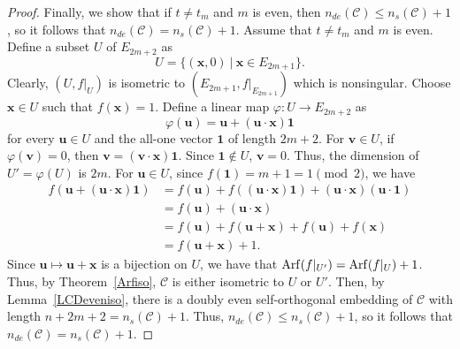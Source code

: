 \documentclass{article}
\theoremstyle{definition}
\theoremstyle{remark}
\begin{document}
\begin{proof}
    Finally, we show that if $t\ne t_m$ and $m$ is even, then $n_{de}(\mathcal{C})\le n_s(\mathcal{C})+1$, so it follows that $n_{de}(\mathcal{C})= n_s(\mathcal{C})+1$. Assume that $t\ne t_m$ and $m$ is even. Define a subset $U$ of $E_{2m+2}$ as
    \[
    U=\{(\mathbf{x}, 0)~|~\mathbf{x}\in E_{2m+1}\}.
    \]
    Clearly, $(U, f|_U)$ is isometric to $(E_{2m+1}, f|_{E_{2m+1}})$ which is nonsingular. Choose $\mathbf{x}\in U$ such that $f(\mathbf{x})=1$. Define a linear map $\varphi:U\to E_{2m+2}$ as
    \[
    \varphi(\mathbf{u})=\mathbf{u}+(\mathbf{u}\cdot \mathbf{x})\mathbf{1}
    \]
    for every $\mathbf{u}\in U$ and the all-one vector $\mathbf{1}$ of length $2m+2$. For $\mathbf{v}\in U$, if $\varphi(\mathbf{v})=0$, then $\mathbf{v}=(\mathbf{v}\cdot \mathbf{x})\mathbf{1}$. Since $\mathbf{1}\notin U$, $\mathbf{v}=0$. Thus, the dimension of $U'=\varphi(U)$ is $2m$.
    For $\mathbf{u}\in U$, since $f(\mathbf{1})=m+1=1\pmod 2$, we have
    \begin{align*}
    f(\mathbf{u}+(\mathbf{u}\cdot \mathbf{x})\mathbf{1})&=f(\mathbf{u})+f((\mathbf{u}\cdot \mathbf{x})\mathbf{1})+(\mathbf{u}\cdot \mathbf{x})(\mathbf{u}\cdot \mathbf{1})\\&=f(\mathbf{u})+(\mathbf{u}\cdot \mathbf{x})\\&=f(\mathbf{u})+f(\mathbf{u}+\mathbf{x})+f(\mathbf{u})+f(\mathbf{x})\\&=f(\mathbf{u}+\mathbf{x})+1.
    \end{align*}
    Since $\mathbf{u}\mapsto\mathbf{u}+\mathbf{x}$ is a bijection on $U$, we have that ${\rm Arf}(f|_{U'})={\rm Arf}(f|_{U})+1$. Thus, by Theorem~\ref{Arfiso}, $\mathcal{C}$ is either isometric to $U$ or $U'$. Then, by Lemma~\ref{LCDeveniso}, there is a doubly even self-orthogonal embedding of $\mathcal{C}$ with length $n+2m+2=n_s(\mathcal{C})+1$. Thus, $n_{de}(\mathcal{C})\le n_s(\mathcal{C})+1$, so it follows that $n_{de}(\mathcal{C})= n_s(\mathcal{C})+1$.
\end{proof}
\end{document}
